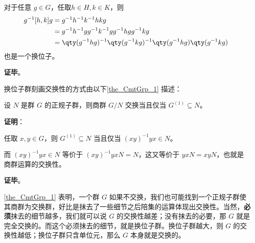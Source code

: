 对于任意 $g\in G$，任取$h\in H, k\in K$，则
\begin{equation}
\begin{aligned}
g^{-1}[h, k]g ={}& g^{-1}h^{-1}k^{-1}hkg\\
={}& g^{-1}h^{-1}gg^{-1}k^{-1}gg^{-1}hgg^{-1}kg\\
={}& \qty(g^{-1}hg)^{-1}\qty(g^{-1}kg)^{-1}\qty(g^{-1}hg)\qty(g^{-1}kg)
\end{aligned}~
\end{equation}
也是一个换位子。

\textbf{证毕}。




换位子群刻画交换性的方式由以下\autoref{the_CmtGrp_1} 描述：

\begin{theorem}{}\label{the_CmtGrp_1}
设 $N$ 是群 $G$ 的正规子群，则商群 $G/N$ 交换当且仅当 $G^{(1)}\subseteq N$。
\end{theorem}

\textbf{证明}：

任取 $x, y\in G$，则 $G^{(1)}\subseteq N$ 当且仅当 $(xy)^{-1}yx\in N$。

而 $(xy)^{-1}yx\in N$ 等价于 $(xy)^{-1}yxN=N$，这又等价于 $yxN=xyN$，也就是商群运算的交换性。



\textbf{证毕}。

\autoref{the_CmtGrp_1} 表明，一个群 $G$ 如果不交换，我们也可能找到一个正规子群使其商群为交换群，好比是抹去了一些细节之后陪集的运算体现出交换性。当然，\textbf{必须}抹去的细节越多，我们就可以说 $G$ 的交换性越差；没有抹去的必要，那 $G$ 就是完全交换的。而这个必须抹去的细节，就是换位子群。换位子群越大，则 $G$ 的交换性越低；换位子群只含单位元，那么 $G$ 本身就是交换的。












